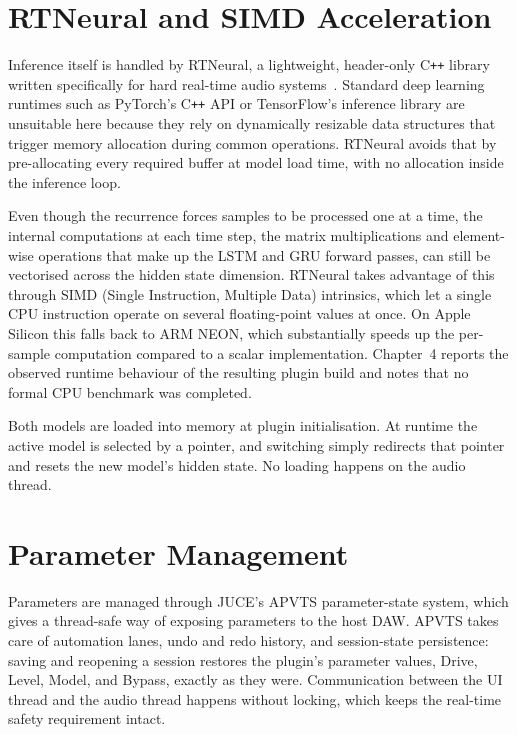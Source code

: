\section{RTNeural and SIMD Acceleration}

Inference itself is handled by RTNeural, a lightweight, header-only C\texttt{++} library written specifically for hard real-time audio systems~\cite{chowdhury_rtneural_2021}. Standard deep learning runtimes such as PyTorch's C\texttt{++} API or TensorFlow's inference library are unsuitable here because they rely on dynamically resizable data structures that trigger memory allocation during common operations. RTNeural avoids that by pre-allocating every required buffer at model load time, with no allocation inside the inference loop.

Even though the recurrence forces samples to be processed one at a time, the internal computations at each time step, the matrix multiplications and element-wise operations that make up the LSTM and GRU forward passes, can still be vectorised across the hidden state dimension. RTNeural takes advantage of this through SIMD (Single Instruction, Multiple Data) intrinsics, which let a single CPU instruction operate on several floating-point values at once. On Apple Silicon this falls back to ARM NEON, which substantially speeds up the per-sample computation compared to a scalar implementation. Chapter~4 reports the observed runtime behaviour of the resulting plugin build and notes that no formal CPU benchmark was completed.

Both models are loaded into memory at plugin initialisation. At runtime the active model is selected by a pointer, and switching simply redirects that pointer and resets the new model's hidden state. No loading happens on the audio thread.

\section{Parameter Management}

Parameters are managed through JUCE's APVTS parameter-state system, which gives a thread-safe way of exposing parameters to the host DAW. APVTS takes care of automation lanes, undo and redo history, and session-state persistence: saving and reopening a session restores the plugin's parameter values, Drive, Level, Model, and Bypass, exactly as they were. Communication between the UI thread and the audio thread happens without locking, which keeps the real-time safety requirement intact.

